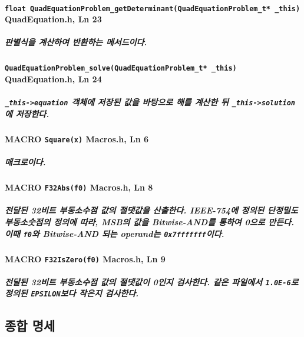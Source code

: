 \documentclass{article}
\begin{document}
    \paragraph{\large\texttt{float QuadEquationProblem\_getDeterminant(QuadEquationProblem\_t* \_this)} \tiny QuadEquation.h, Ln 23}

    \subparagraph{\normalfont 판별식을 계산하여 반환하는 메서드이다.}

    \paragraph{\large\texttt{QuadEquationProblem\_solve(QuadEquationProblem\_t* \_this)} \tiny QuadEquation.h, Ln 24}

    \subparagraph{\normalfont \texttt{\_this->equation} 객체에 저장된 값을 바탕으로 해를 계산한 뒤 \texttt{\_this->solution}에 저장한다.}


    \paragraph{MACRO \large\texttt{Square(x)} \tiny Macros.h, Ln 6}

    \subparagraph{ 매크로이다.}

    \paragraph{MACRO \large\texttt{F32Abs(f0)} \tiny Macros.h, Ln 8}

    \subparagraph{ 전달된 32비트 부동소수점 값의 절댓값을 산출한다. IEEE-754에 정의된 단정밀도 부동소숫점의 정의에 따라, MSB의 값을 Bitwise-AND를 통하여 0으로 만든다. \\ 이때 \texttt{f0}와 Bitwise-AND 되는 operand는 \texttt{0x7fffffff}이다.}

    \paragraph{MACRO \large\texttt{F32IsZero(f0)} \tiny Macros.h, Ln 9}

    \subparagraph{ 전달된 32비트 부동소수점 값의 절댓값이 0인지 검사한다. 같은 파일에서 \texttt{1.0E-6}로 정의된 \texttt{EPSILON}보다 작은지 검사한다.}

    \subsection{종합 명세}
\end{document}

